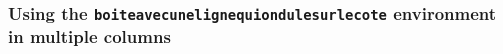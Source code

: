 \documentclass[a4paper,10pt]{article}
\begin{document}
\subsubsection*{Using the \texttt{boiteavecunelignequiondulesurlecote} environment in multiple columns}

\begin{Example}
  \bkcountfalse
  \begin{multicols}{2}
    \lipsum[1]
    \begin{boiteavecunelignequiondulesurlecote}
      \lipsum[2-4]
    \end{boiteavecunelignequiondulesurlecote}
    \lipsum[5]
    \begin{boiteavecunelignequiondulesurlecote}
      \lipsum[6-8]
    \end{boiteavecunelignequiondulesurlecote}
    \lipsum[9-14]
  \end{multicols}
\end{Example}
\end{document}
